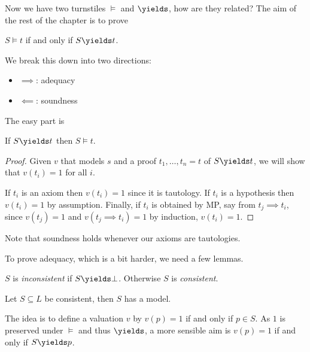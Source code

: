 \documentclass[a4paper]{article}
\begin{document}
Now we have two turnstiles \(\models\) and \(\yields\), how are they related? The aim of the rest of the chapter is to prove

\begin{theorem}
  \(S \models t\) if and only if \(S \yields t\).
\end{theorem}

We break this down into two directions:
\begin{itemize}
\item \(\implies\): adequacy
\item \(\impliedby\): soundness
\end{itemize}

The easy part is

\begin{proposition}[Soundness]
  If \(S \yields t\) then \(S \models t\).
\end{proposition}

\begin{proof}
  Given \(v\) that models \(s\) and a proof \(t_1, \dots, t_n = t\) of \(S \yields t\), we will show that \(v(t_i) = 1\) for all \(i\).

  If \(t_i\) is an axiom then \(v(t_i) = 1\) since it is tautology. If \(t_i\) is a hypothesis then \(v(t_i) = 1\) by assumption. Finally, if \(t_i\) is obtained by MP, say from \(t_j \implies t_i\), since \(v(t_j) = 1\) and \(v(t_j \implies t_i) = 1\) by induction, \(v(t_i) = 1\).
\end{proof}

Note that soundness holds whenever our axioms are tautologies.

To prove adequacy, which is a bit harder, we need a few lemmas.

\begin{definition}[Consistency]
  \(S\) is \emph{inconsistent} if \(S \yields \bot\). Otherwise \(S\) is \emph{consistent}.
\end{definition}

\begin{theorem}
  Let \(S \subseteq L\) be consistent, then \(S\) has a model.
\end{theorem}

The idea is to define a valuation \(v\) by \(v(p) = 1\) if and only if \(p \in S\). As \(1\) is preserved under \(\models\) and thus \(\yields\), a more sensible aim is \(v(p) = 1\) if and only if \(S \yields p\).
\end{document}
